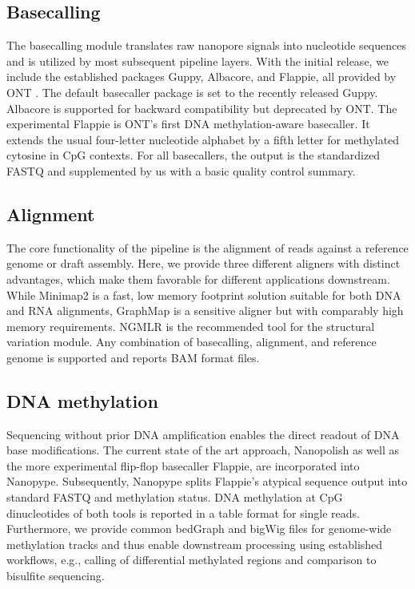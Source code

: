 \subsection{Basecalling}
\label{subsec:nanopype:basecalling}
The basecalling module translates raw nanopore signals into nucleotide sequences and is utilized by most subsequent pipeline layers. With the initial release, we include the established packages Guppy, Albacore, and Flappie, all provided by ONT \cite{Wick2019}. The default basecaller package is set to the recently released Guppy. Albacore is supported for backward compatibility but deprecated by ONT. The experimental Flappie is ONT’s first DNA methylation-aware basecaller. It extends the usual four-letter nucleotide alphabet by a fifth letter for methylated cytosine in CpG contexts. For all basecallers, the output is the standardized FASTQ and supplemented by us with a basic quality control summary.

\subsection{Alignment}
\label{subsec:nanopype:alignment}
The core functionality of the pipeline is the alignment of reads against a reference genome or draft assembly. Here, we provide three different aligners with distinct advantages, which make them favorable for different applications downstream. While Minimap2 \cite{Li2018} is a fast, low memory footprint solution suitable for both DNA and RNA alignments, GraphMap \cite{Sovic2016} is a sensitive aligner but with comparably high memory requirements. NGMLR \cite{Sedlazeck2018} is the recommended tool for the structural variation module. Any combination of basecalling, alignment, and reference genome is supported and reports BAM format files.


\subsection{DNA methylation}
\label{subsec:nanopype:methylation}
Sequencing without prior DNA amplification enables the direct readout of DNA base modifications. The current state of the art approach, Nanopolish \cite{Simpson2017} as well as the more experimental flip-flop basecaller Flappie, are incorporated into Nanopype. Subsequently, Nanopype splits Flappie’s atypical sequence output into standard FASTQ and methylation status. DNA methylation at CpG dinucleotides of both tools is reported in a table format for single reads. Furthermore, we provide common bedGraph and bigWig files for genome-wide methylation tracks and thus enable downstream processing using established workflows, e.g., calling of differential methylated regions and comparison to bisulfite sequencing.

